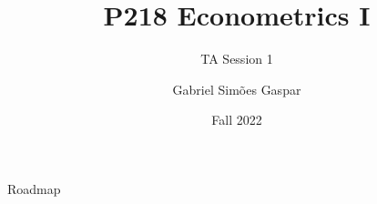\documentclass[10pt, xcolor=dvipsnames,compress]{beamer}
\title{P218 Econometrics I}
\subtitle{TA Session 1}
\author{Gabriel Simões Gaspar}
\institute{London Business School}
\date{Fall 2022}
\begin{document}
\maketitle

\begin{frame}{Roadmap}
    \tableofcontents
\end{frame}







\end{document}
